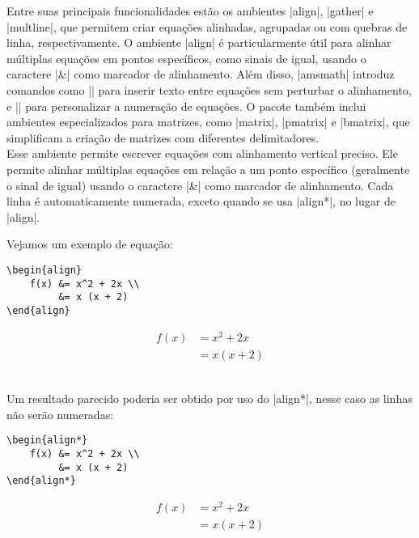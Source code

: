 \documentclass{ltxdoc}
\begin{document}
Entre suas principais funcionalidades estão os ambientes |align|, |gather| e |multline|, que permitem criar equações alinhadas, agrupadas ou com quebras de linha, respectivamente. O ambiente |align| é particularmente útil para alinhar múltiplas equações em pontos específicos, como sinais de igual, usando o caractere |&| como marcador de alinhamento. Além disso, |amsmath| introduz comandos como |\intertext{}| para inserir texto entre equações sem perturbar o alinhamento, e |\tag{}| para personalizar a numeração de equações. O pacote também inclui ambientes especializados para matrizes, como |matrix|, |pmatrix| e |bmatrix|, que simplificam a criação de matrizes com diferentes delimitadores.
\\


 Esse ambiente permite escrever equações com
alinhamento vertical preciso. Ele permite alinhar múltiplas equações
em relação a um ponto específico (geralmente o sinal de igual) usando
o caractere |&| como marcador de alinhamento. Cada linha é
automaticamente numerada, exceto quando se usa |align*|, no lugar de
|align|.

Vejamos um exemplo de equação:\\
\begin{minipage}{0.3\textwidth}
\begin{verbatim}
\begin{align}
    f(x) &= x^2 + 2x \\
         &= x (x + 2)
\end{align}
\end{verbatim}
\end{minipage}
\begin{minipage}{0.3\textwidth}
\begin{align}
    f(x) &= x^2 + 2x \\
         &= x (x + 2)
\end{align}
\end{minipage}\\

Um resultado parecido poderia ser obtido por uso do |align*|, nesse
caso as linhas não serão numeradas:\\

\begin{minipage}{0.3\textwidth}
\begin{verbatim}
\begin{align*}
    f(x) &= x^2 + 2x \\
         &= x (x + 2)
\end{align*}
\end{verbatim}
\end{minipage}
\begin{minipage}{0.3\textwidth}
\begin{align*}
    f(x) &= x^2 + 2x \\
         &= x (x + 2)
\end{align*}
\end{minipage}\\
\end{document}

